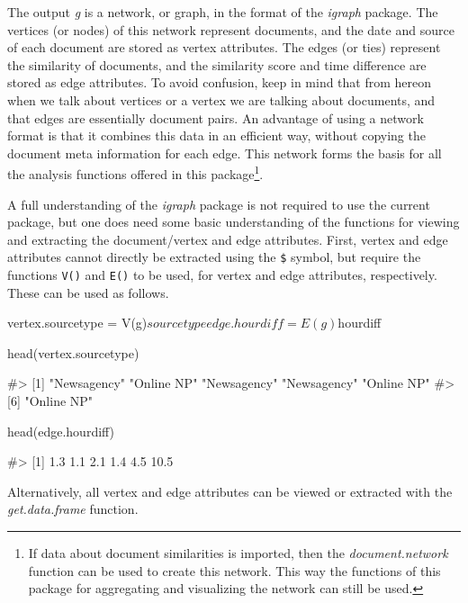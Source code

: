 The output \emph{g} is a network, or graph, in the format of the
\emph{igraph} package. The vertices (or nodes) of this network represent
documents, and the date and source of each document are stored as vertex
attributes. The edges (or ties) represent the similarity of documents,
and the similarity score and time difference are stored as edge
attributes. To avoid confusion, keep in mind that from hereon when we
talk about vertices or a vertex we are talking about documents, and that
edges are essentially document pairs. An advantage of using a network
format is that it combines this data in an efficient way, without
copying the document meta information for each edge. This network forms
the basis for all the analysis functions offered in this
package\footnote{If data about document similarities is imported, then
  the \emph{document.network} function can be used to create this
  network. This way the functions of this package for aggregating and
  visualizing the network can still be used.}.

A full understanding of the \emph{igraph} package is not required to use
the current package, but one does need some basic understanding of the
functions for viewing and extracting the document/vertex and edge
attributes. First, vertex and edge attributes cannot directly be
extracted using the \texttt{\$} symbol, but require the functions
\texttt{V()} and \texttt{E()} to be used, for vertex and edge
attributes, respectively. These can be used as follows.

\begin{Schunk}
\begin{Sinput}
vertex.sourcetype = V(g)$sourcetype
edge.hourdiff = E(g)$hourdiff

head(vertex.sourcetype)
\end{Sinput}
\begin{Soutput}
#> [1] "Newsagency" "Online NP"  "Newsagency" "Newsagency" "Online NP" 
#> [6] "Online NP"
\end{Soutput}
\begin{Sinput}
head(edge.hourdiff)
\end{Sinput}
\begin{Soutput}
#> [1]  1.3  1.1  2.1  1.4  4.5 10.5
\end{Soutput}
\end{Schunk}

Alternatively, all vertex and edge attributes can be viewed or extracted
with the \emph{get.data.frame} function.

